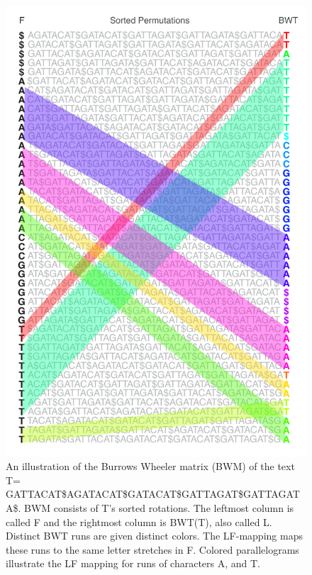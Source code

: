 \documentclass[11pt]{ucthesis}
\begin{document}
\begin{figure}[h]
    \centering
    \includegraphics[width=0.5\linewidth]{Images/bwt_tag.pdf}
    \caption[An illustration of the Burrows Wheeler matrix]{An illustration of the Burrows Wheeler matrix (BWM) of the text T= GATTACAT\$AGATACAT\$GATACAT\$GATTAGAT\$GATTAGATA\$. BWM consists of T’s sorted rotations. The leftmost column is called F and the rightmost column is BWT(T), also called L. Distinct BWT runs are given distinct colors. The LF-mapping maps these runs to the same letter stretches in F. Colored parallelograms illustrate the LF mapping for runs of characters A, and T.}
    \label{fig:2:1}
\end{figure}
\end{document}
